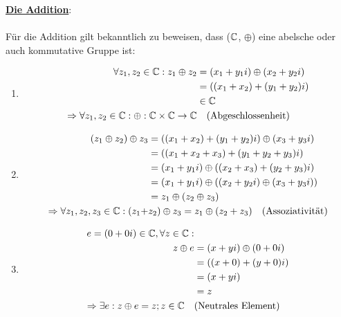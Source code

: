 	\begin{Beweis}
		\underline{\textbf{Die Addition}}:

		\paragraph{} Für die Addition gilt bekanntlich zu beweisen, dass ($\mathbb{C}$, $\oplus$) eine abelsche oder auch kommutative Gruppe ist:

		\begin{enumerate}[1)]
			\item \begin{align*}
						\forall z_1, z_2 \in \C: z_1 \oplus z_2 &\definedBy (x_1 + y_1i) \oplus (x_2 + y_2i) \\
														   		&= ((x_1 + x_2) + (y_1 + y_2)i) \\
														   		&\in \C \\
						\Rightarrow \forall z_1, z_2 \in \C: \oplus : \C \times \C \rightarrow \C & \quad \text{(Abgeschlossenheit)}
				  \end{align*}
			\item \begin{align*}
				  		(z_1 \oplus z_2) \oplus z_3 &= ((x_1 + x_2) + (y_1 + y_2)i) \oplus (x_3 + y_3i) \\
										  			&= ((x_1 + x_2 + x_3) + (y_1 + y_2 + y_3)i) \\
												    &= (x_1 + y_1i) \oplus ((x_2 + x_3) + (y_2 + y_3)i) \\
												    &= (x_1 + y_1i) \oplus ((x_2 + y_2i) \oplus (x_3 + y_3i)) \\
												    &= z_1 \oplus (z_2 \oplus z_3) \\
						\Rightarrow \forall z_1, z_2, z_3 \in \mathbb{C}: (z_1 + &z_2) \oplus  z_3 = z_1 \oplus (z_2 + z_3) \quad \text{(Assoziativität)}
				  \end{align*}
			\item \begin{align*}
						e = (0 + 0i) \in \mathbb{C}, \forall z \in \mathbb{C}:& \\
												   z \oplus e &= (x + yi) \oplus (0 + 0i) \\
													  		  &= ((x + 0) + (y + 0)i) \\
															  &= (x + yi) \\
															  &= z \\
						\Rightarrow \exists e: z \oplus e = z; z \in \mathbb{C} \quad &\text{(Neutrales Element)}
				  \end{align*}

\end{enumerate}
\end{Beweis}
